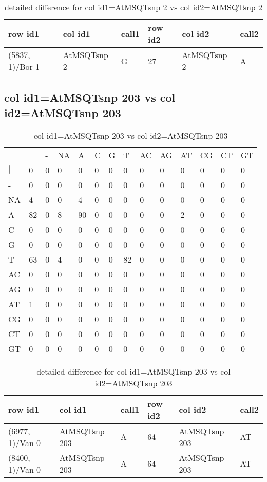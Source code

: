 \begin{center}
\begin{longtable}{|l|l|l|l|l|l|}
\caption{detailed difference for col id1=AtMSQTsnp 2 vs col id2=AtMSQTsnp 2} \label{table_dm767}\\
\hline
row id1&col id1&call1&row id2&col id2&call2\\
\hline
(5837, 1)/Bor-1&AtMSQTsnp 2&G&27&AtMSQTsnp 2&A\\
\hline
\end{longtable}
\end{center}

\subsection{col id1=AtMSQTsnp 203 vs col id2=AtMSQTsnp 203}
\begin{center}
\begin{longtable}{|l|l|l|l|l|l|l|l|l|l|l|l|l|l|}
\caption{col id1=AtMSQTsnp 203 vs col id2=AtMSQTsnp 203} \label{table_dm768}\\
\hline
\\
\hline
&$|$&-&NA&A&C&G&T&AC&AG&AT&CG&CT&GT\\
$|$&0&0&0&0&0&0&0&0&0&0&0&0&0\\
-&0&0&0&0&0&0&0&0&0&0&0&0&0\\
NA&4&0&0&4&0&0&0&0&0&0&0&0&0\\
A&82&0&8&90&0&0&0&0&0&2&0&0&0\\
C&0&0&0&0&0&0&0&0&0&0&0&0&0\\
G&0&0&0&0&0&0&0&0&0&0&0&0&0\\
T&63&0&4&0&0&0&82&0&0&0&0&0&0\\
AC&0&0&0&0&0&0&0&0&0&0&0&0&0\\
AG&0&0&0&0&0&0&0&0&0&0&0&0&0\\
AT&1&0&0&0&0&0&0&0&0&0&0&0&0\\
CG&0&0&0&0&0&0&0&0&0&0&0&0&0\\
CT&0&0&0&0&0&0&0&0&0&0&0&0&0\\
GT&0&0&0&0&0&0&0&0&0&0&0&0&0\\
\hline
\end{longtable}
\end{center}

\begin{center}
\begin{longtable}{|l|l|l|l|l|l|}
\caption{detailed difference for col id1=AtMSQTsnp 203 vs col id2=AtMSQTsnp 203} \label{table_dm769}\\
\hline
row id1&col id1&call1&row id2&col id2&call2\\
\hline
(6977, 1)/Van-0&AtMSQTsnp 203&A&64&AtMSQTsnp 203&AT\\
(8400, 1)/Van-0&AtMSQTsnp 203&A&64&AtMSQTsnp 203&AT\\
\hline
\end{longtable}
\end{center}

